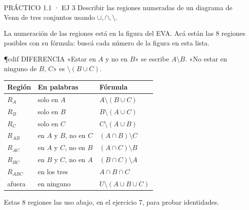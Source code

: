 \begin{enunciado}{PRÁCTICO 1.1 · EJ 3}
Describir las regiones numeradas de un diagrama de Venn de tres conjuntos usando $\cup,\cap,\setminus$.
\end{enunciado}
\begin{falta}
La numeración de las regiones está en la figura del EVA. Acá están las 8 regiones posibles con su fórmula: buscá cada número de la figura en esta lista.
\end{falta}
\begin{uso}{\P{cdif} DIFERENCIA}
«Estar en $A$ y no en $B$» se escribe $A\setminus B$. «No estar en ninguno de $B$, $C$» es $\setminus(B\cup C)$.
\end{uso}
\begin{center}\small
\begin{tabular}{@{}lll@{}}\toprule
Región & En palabras & Fórmula\\\midrule
$R_A$ & solo en $A$ & $A\setminus(B\cup C)$\\
$R_B$ & solo en $B$ & $B\setminus(A\cup C)$\\
$R_C$ & solo en $C$ & $C\setminus(A\cup B)$\\
$R_{AB}$ & en $A$ y $B$, no en $C$ & $(A\cap B)\setminus C$\\
$R_{AC}$ & en $A$ y $C$, no en $B$ & $(A\cap C)\setminus B$\\
$R_{BC}$ & en $B$ y $C$, no en $A$ & $(B\cap C)\setminus A$\\
$R_{ABC}$ & en los tres & $A\cap B\cap C$\\
afuera & en ninguno & $U\setminus(A\cup B\cup C)$\\\bottomrule
\end{tabular}
\end{center}
Estas 8 regiones las uso abajo, en el ejercicio 7, para probar identidades.

